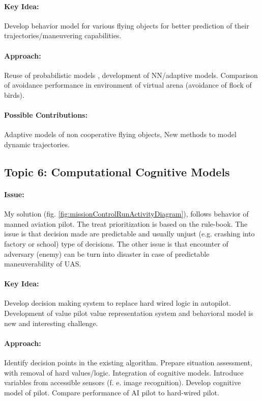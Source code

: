 \documentclass[a4paper,narrowmargins,11pt,oneside,onehalfspaced,singlespacednotes]{fcup-thesis}
\theoremstyle{plain}
\theoremstyle{plain}
\theoremstyle{remark}
\begin{document}
\paragraph{Key Idea:} Develop behavior model for various flying objects for better prediction of their trajectories/maneuvering capabilities.

\paragraph{Approach:} Reuse of probabilistic models \cite{gomola2017probabilistic}, development of NN/adaptive models. Comparison of avoidance performance in environment of virtual arena \cite{allesandeti2016virtualArena} (avoidance of flock of birds).

\paragraph{Possible Contributions:} Adaptive models of non cooperative flying objects, New methods to model dynamic trajectories.

\subsection*{Topic 6: Computational Cognitive Models}
\paragraph{Issue:} My solution (fig. \ref{fig:missionControlRunActivityDiagram}), follows behavior of manned aviation pilot. The treat prioritization is based on the rule-book. The issue is that decision made are predictable and usually unjust (e.g. crashing into factory or school) type of decisions. The other issue is that encounter of adversary (enemy) can be turn into disaster in case of predictable maneuverability of UAS.

\paragraph{Key Idea:} Develop decision making system to replace hard wired logic in autopilot. Development of value pilot value representation system and behavioral model is new and interesting challenge.

\paragraph{Approach:} Identify decision points in the existing algorithm. Prepare situation assessment, with removal of hard values/logic. Integration of cognitive models. Introduce variables from accessible sensors (f. e. image recognition). Develop cognitive model of pilot. Compare performance of AI pilot to hard-wired pilot.
\end{document}
